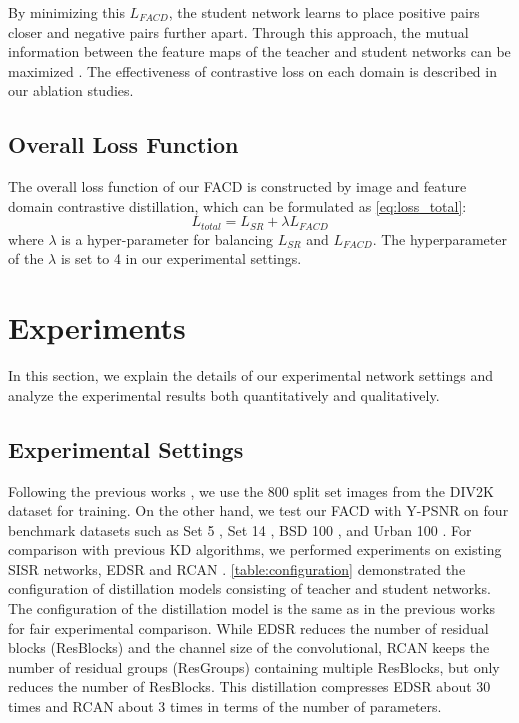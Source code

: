 \documentclass[10pt,twocolumn,letterpaper]{article}
\begin{document}
By minimizing this \begin{math}L_{FACD}\end{math}, the student network learns to place positive pairs closer and negative pairs further apart. Through this approach, the mutual information between the feature maps of the teacher and student networks can be maximized \cite{crd}. The effectiveness of contrastive loss on each domain is described in our ablation studies. 



\subsection{Overall Loss Function}
\label{overall}
The overall loss function of our FACD is constructed by image and feature domain contrastive distillation, which can be formulated as \cref{eq:loss_total}:
\begin{equation}
  L_{total}= L_{SR}+ \lambda L_{FACD}
  \label{eq:loss_total}
\end{equation}
where \begin{math}\lambda\end{math} is a hyper-parameter for balancing \begin{math}L_{SR}\end{math} and   \begin{math}L_{FACD}\end{math}. The hyperparameter of the \begin{math}\lambda\end{math} is set to 4 in our experimental settings.


\section{Experiments}
In this section, we explain the details of our experimental network settings and analyze the experimental results both quantitatively and qualitatively.

\subsection{Experimental Settings}
Following the previous works \cite{san, fakd, edsr2, lsfd, csd2021, RCAN}, we use the 800 split set images from the DIV2K dataset \cite{div2k} for training. On the other hand, we test our FACD with Y-PSNR on four benchmark datasets such as Set 5 \cite{set5}, Set 14 \cite{set14}, BSD 100 \cite{b100}, and Urban 100 \cite{urban100}. For comparison with previous KD algorithms, we performed experiments on existing SISR networks, EDSR \cite{edsr2} and RCAN \cite{RCAN}. \cref{table:configuration} demonstrated the configuration of distillation models consisting of teacher and student networks. The configuration of the distillation model is the same as in the previous works for fair experimental comparison. While EDSR reduces the number of residual blocks (ResBlocks) and the channel size of the convolutional, RCAN keeps the number of residual groups (ResGroups) containing multiple ResBlocks, but only reduces the number of ResBlocks. This distillation compresses EDSR about 30 times and RCAN about 3 times in terms of the number of parameters.
\end{document}
